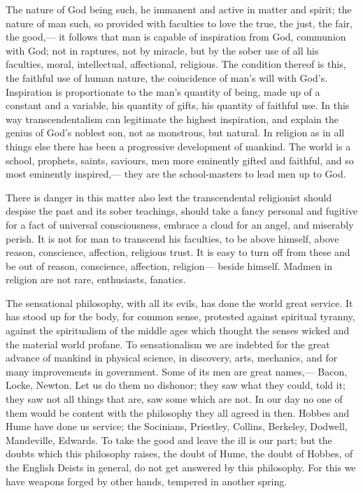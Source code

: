 \documentclass[12pt]{article}
\begin{document}
The nature of God being such, he immanent and active in matter and spirit; the nature of man such, so provided with faculties to love the true, the just, the fair, the good,--- it follows that man is capable of inspiration from God, communion with God; not in raptures, not by miracle, but by the sober use of all his faculties, moral, intellectual, affectional, religious. The condition thereof is this, the faithful use of human nature, the coincidence of man's will with God's. Inspiration is proportionate to the man's quantity of being, made up of a constant and a variable, his quantity of gifts, his quantity of faithful use. In this way transcendentalism can legitimate the highest inspiration, and explain the genius of God's noblest son, not as monstrous, but natural. In religion as in all things else there has been a progressive development of mankind. The world is a school, prophets, saints, saviours, men more eminently gifted and faithful, and so most eminently inspired,--- they are the school-masters to lead men up to God. 

There is danger in this matter also lest the transcendental religionist should despise the past and its sober teachings, should take a fancy personal and fugitive for a fact of universal consciousness, embrace a cloud for an angel, and miserably perish. It is not for man to transcend his faculties, to be above himself, above reason, conscience, affection, religious trust. It is easy to turn off from these and be out of reason, conscience, affection, religion--- beside himself. Madmen in religion are not rare, enthusiasts, fanatics. 

The sensational philosophy, with all its evils, has done the world great service. It has stood up for the body, for common sense, protested against spiritual tyranny, against the spiritualism of the middle ages which thought the senses wicked and the material world profane. To sensationalism we are indebted for the great advance of mankind in physical science, in discovery, arts, mechanics, and for many improvements in government. Some of its men are great names,--- Bacon, Locke, Newton. Let us do them no dishonor; they saw what they could, told it; they saw not all things that are, saw some which are not. In our day no one of them would be content with the philosophy they all agreed in then. Hobbes and Hume have done us service; the Socinians, Priestley, Collins, Berkeley, Dodwell, Mandeville, Edwards. To take the good and leave the ill is our part; but the doubts which this philosophy raises, the doubt of Hume, the doubt of Hobbes, of the English Deists in general, do not get answered by this philosophy. For this we have weapons forged by other hands, tempered in another spring. 
\end{document}
